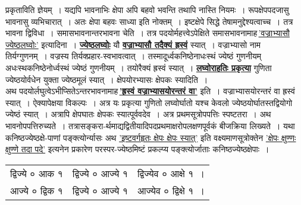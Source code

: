 \documentclass[11pt, openany]{book}
\begin{document}
\newpage

\begin{sloppypar}
\noindent प्रकृताविति ज्ञेयम्~। यद्यपि भावनाभिः क्षेपा अपि बहवो भवन्ति तथापि नास्ति नियमः~। रूपक्षेपपदजासु भावनासु व्यभिचारात्~। अतः क्षेपा बहवः साध्या इति नोक्तम्~। इष्टक्षेपे सिद्धे तेषामनुद्देश्यत्वाच्च~। तत्र भावना द्विविधा~। समासभावनान्तरभावना चेति~। तत्र पदयोर्महत्त्वेऽपेक्षिते समासभावनामाह\textendash \,\hyperref[6.71]{'वज्राभ्यासौ ज्येष्ठलघ्वोः'} इत्यादिना~। \hyperref[6.71]{\textbf{ज्येष्ठलघ्वोः}} यौ \hyperref[6.71]{\textbf{वज्राभ्यासौ तदैक्यं ह्रस्वं}} स्यात्~। वज्राभ्यासो नाम तिर्यग्गुणनम्~। वज्रस्य तिर्यक्प्रहार-स्वभावत्वात्~। तस्मादूर्ध्वकनिष्ठेनाधःस्थं ज्येष्ठं गुणनीयम् अधःस्थकनिष्ठेनोर्ध्वस्थं ज्येष्ठं गुणनीयम्~। तयोरैक्यं ह्रस्वं स्यात्~। \hyperref[6.71]{\textbf{लघ्वोराहतिः प्रकृत्या}} गुणिता ज्येष्ठयोर्वधेन युक्ता ज्येष्ठमूलं स्यात्~। क्षेपयोरभ्यासः क्षेपकः स्यादिति~। \\

अथ पदयोर्लघुत्वेऽभीप्सितेऽन्तरभावनामाह\textendash \,\hyperref[6.71]{\textbf{'ह्रस्वं वज्राभ्यासयोरन्तरं वा'}} इति~। वज्राभ्यासयोरन्तरं वा ह्रस्वं स्यात्~। ऐक्यापेक्षया विकल्पः~। अत्र यः प्रकृत्या गुणितो लघ्वोर्घातो यश्च केवलो ज्येष्ठयोर्घातस्तद्वियोगो ज्येष्ठं स्यात्~। अत्रापि क्षेपघातः क्षेपकः स्यात्पूर्ववदेव~। अत्र प्रथमसूत्रोपपत्तिः स्पष्टतरा~। अथ भावनोपपत्तिरुच्यते~। तत्रासङ्करा-र्थमाद्यद्वितीयादिपदप्रथमाक्षरोपलक्षणपूर्वकं बीजक्रिया लिख्यते~। यथा\textendash \,कनिष्ठज्येष्ठक्षे-पाणां पङ्क्त्योर्न्यासः \; अथ \hyperref[6.72]{'इष्टवर्गहृतः क्षेपः क्षेपः स्यात्'} इति वक्ष्यमाणसूत्रोक्तेन \hyperref[6.72]{'क्षेपः क्षुण्णः क्षुण्णे तदा पदे'} इत्यनेन प्रकारेण परस्पर-ज्येष्ठमिष्टं प्रकल्प्य पङ्क्त्योर्जाताः कनिष्ठज्येष्ठक्षेपाः~। 
\vspace{-1mm}

\begin{center}
\begin{tabular}{lll}
द्विज्ये ० आक १ & द्विज्ये ० आज्ये १ & द्विज्येव ० आक्षे १~।\\
आज्ये ० द्विक १ & द्विज्ये ० आज्ये १ & आज्येव ० द्विक्षे १~।
\end{tabular}
\end{center}
\vspace{-1mm}


\end{sloppypar}
\end{document}
